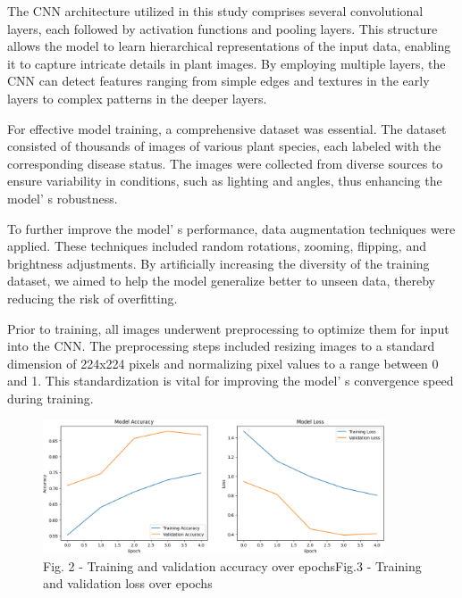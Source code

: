 \begin{multicols}{2}
The CNN architecture utilized in this study comprises several
convolutional layers, each followed by activation functions and pooling
layers. This structure allows the model to learn hierarchical
representations of the input data, enabling it to capture intricate
details in plant images. By employing multiple layers, the CNN can
detect features ranging from simple edges and textures in the early
layers to complex patterns in the deeper layers.

For effective model training, a comprehensive dataset was essential. The
dataset consisted of thousands of images of various plant species, each
labeled with the corresponding disease status. The images were collected
from diverse sources to ensure variability in conditions, such as
lighting and angles, thus enhancing the model' s
robustness.

To further improve the model' s performance, data
augmentation techniques were applied. These techniques included random
rotations, zooming, flipping, and brightness adjustments. By
artificially increasing the diversity of the training dataset, we aimed
to help the model generalize better to unseen data, thereby reducing the
risk of overfitting.

Prior to training, all images underwent preprocessing to optimize them
for input into the CNN. The preprocessing steps included resizing images
to a standard dimension of 224x224 pixels and normalizing pixel values
to a range between 0 and 1. This standardization is vital for improving
the model' s convergence speed during training.
\end{multicols}

\begin{figure}[H]
	\centering
	\includegraphics[width=0.9\textwidth]{media/ict/image32}
	\caption*{Fig. 2 - Training and validation accuracy over epochs\hfill Fig.3 - Training and validation loss over epochs}
\end{figure}


